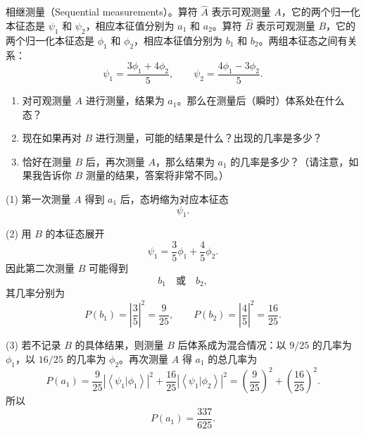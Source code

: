 \begin{question}
相继测量（Sequential measurements）。算符 $\hat A$ 表示可观测量 $A$，它的两个归一化本征态是 $\psi_1$ 和 $\psi_2$，相应本征值分别为 $a_1$ 和 $a_2$。算符 $\hat B$ 表示可观测量 $B$，它的两个归一化本征态是 $\phi_1$ 和 $\phi_2$，相应本征值分别为 $b_1$ 和 $b_2$。两组本征态之间有关系：
\[
\psi_1=\frac{3\phi_1+4\phi_2}{5},
\qquad
\psi_2=\frac{4\phi_1-3\phi_2}{5}.
\]
\begin{enumerate}
\item 对可观测量 $A$ 进行测量，结果为 $a_1$。那么在测量后（瞬时）体系处在什么态？
\item 现在如果再对 $B$ 进行测量，可能的结果是什么？出现的几率是多少？
\item 恰好在测量 $B$ 后，再次测量 $A$，那么结果为 $a_1$ 的几率是多少？（请注意，如果我告诉你 $B$ 测量的结果，答案将非常不同。）
\end{enumerate}
\end{question}
\begin{solution}
(1) 第一次测量 $A$ 得到 $a_1$ 后，态坍缩为对应本征态
\[
\boxed{\psi_1.}
\]

(2) 用 $B$ 的本征态展开
\[
\psi_1=\frac{3}{5}\phi_1+\frac{4}{5}\phi_2.
\]
因此第二次测量 $B$ 可能得到
\[
b_1\quad\text{或}\quad b_2,
\]
其几率分别为
\[
P(b_1)=\left|\frac35\right|^2=\frac9{25},
\qquad
P(b_2)=\left|\frac45\right|^2=\frac{16}{25}.
\]

(3) 若不记录 $B$ 的具体结果，则测量 $B$ 后体系成为混合情况：以 $9/25$ 的几率为 $\phi_1$，以 $16/25$ 的几率为 $\phi_2$。再次测量 $A$ 得 $a_1$ 的总几率为
\[
P(a_1)=\frac9{25}|\left\langle \psi_1|\phi_1 \right\rangle|^2
+\frac{16}{25}|\left\langle \psi_1|\phi_2 \right\rangle|^2
=\left(\frac9{25}\right)^2+\left(\frac{16}{25}\right)^2.
\]
所以
\[
\boxed{P(a_1)=\frac{337}{625}.}
\]
\end{solution}

